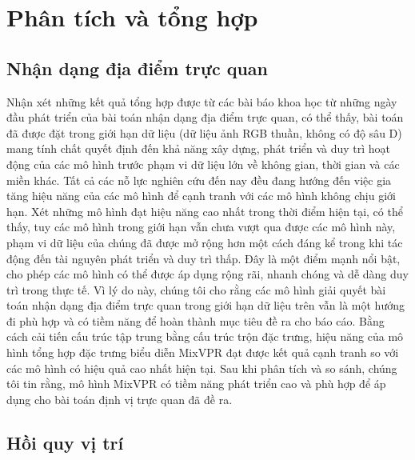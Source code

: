 \section{Phân tích và tổng hợp}

\subsection*{Nhận dạng địa điểm trực quan}

Nhận xét những kết quả tổng hợp được từ các bài báo khoa học từ những ngày đầu phát triển của bài toán nhận dạng địa điểm trực quan, có thể thấy, bài toán đã được đặt trong giới hạn dữ liệu (dữ liệu ảnh RGB thuần, không có độ sâu D) mang tính chất quyết định đến khả năng xây dựng, phát triển và duy trì hoạt động của các mô hình trước phạm vi dữ liệu lớn về không gian, thời gian và các miền khác. Tất cả các nỗ lực nghiên cứu đến nay đều đang hướng đến việc gia tăng hiệu năng của các mô hình để cạnh tranh với các mô hình không chịu giới hạn. Xét những mô hình đạt hiệu năng cao nhất trong thời điểm hiện tại, có thể thấy, tuy các mô hình trong giới hạn vẫn chưa vượt qua được các mô hình này, phạm vi dữ liệu của chúng đã được mở rộng hơn một cách đáng kể trong khi tác động đến tài nguyên phát triển và duy trì thấp. Đây là một điểm mạnh nổi bật, cho phép các mô hình có thể được áp dụng rộng rãi, nhanh chóng và dễ dàng duy trì trong thực tế. Vì lý do này, chúng tôi cho rằng các mô hình giải quyết bài toán nhận dạng địa điểm trực quan trong giới hạn dữ liệu trên vẫn là một hướng đi phù hợp và có tiềm năng để hoàn thành mục tiêu đề ra cho báo cáo. Bằng cách cải tiến cấu trúc tập trung bằng cấu trúc trộn đặc trưng, hiệu năng của mô hình tổng hợp đặc trưng biểu diễn MixVPR \cite{alibey2023mixvpr} đạt được kết quả cạnh tranh so với các mô hình có hiệu quả cao nhất hiện tại. Sau khi phân tích và so sánh, chúng tôi tin rằng, mô hình MixVPR có tiềm năng phát triển cao và phù hợp để áp dụng cho bài toán định vị trực quan đã đề ra.

\subsection*{Hồi quy vị trí}

